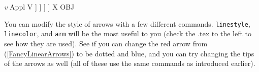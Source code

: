 \documentclass{article}
\begin{document}
\vspace{3em} %

\ea \label{FancyLinearArrows}
   \textit{v}     Appl   V  ] ] ] ] %
\ncbar[angle=90, linestyle=dashed, linecolor=red, arm=30pt] {->} {X} {OBJ} %
\z

You can modify the style of arrows with a few different commands. \verb|linestyle|, \verb|linecolor|, and \verb|arm| will be the most useful to you (check the .tex to the left to see how they are used). See if you can change the red arrow from (\ref{FancyLinearArrows}) to be dotted and blue, and you can try changing the tips of the arrows as well (all of these use the same commands as introduced earlier). 
\end{document}
